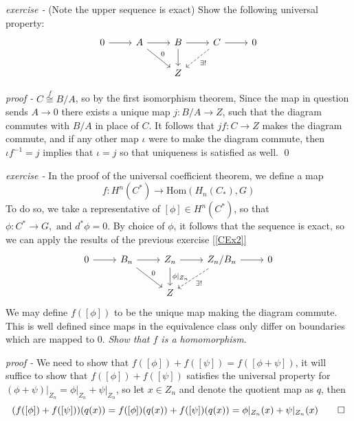 \documentclass[11pt]{article}
\theoremstyle{definition}
\newcommand{\tand}{\text{ and }}
\newcommand{\homo}{\text{Hom}}
\begin{document}

    \emph{exercise - }\label{CEx2} (Note the upper sequence is exact) Show the following universal property:
    \begin{equation*}
    \begin{tikzcd}
        0 \arrow[r] & A \arrow[r] \arrow[rd,"{0}"] & B \arrow[r] \arrow[d] & C \arrow[r] \arrow[ld,dashed,"{\exists !}"] & 0 \\
        & & Z
    \end{tikzcd}
    \end{equation*}

    \emph{proof - } \(C \overset{f}{\cong} B/A\), so by the first isomorphism theorem, Since the map in question sends \(A \to 0\) there exists a unique map \(j : B/A \to Z\), such that the diagram commutes with \(B/A\) in place of \(C\). It follows that \(jf: C \to Z\) makes the diagram commute, and if any other map \(\iota\) were to make the diagram commute, then \(\iota f^{-1} = j\) implies that \(\iota = j\) so that uniqueness is satisfied as well.  \qed


    \emph{exercise - }\label{CEx3} In the proof of the universal coefficient theorem, we define a map \[f: H^n(C^*) \to \homo(H_n(C_*),G)\]
    To do so, we take a representative of \([\phi] \in H^n(C^*)\), so that \(\phi: C^* \to G, \tand d^* \phi = 0\). By choice of \(\phi\), it follows that the sequence is exact, so we can apply the results of the previous exercise [\ref{CEx2}]
    \begin{equation*}
        \begin{tikzcd}
            0 \arrow[r] & B_n \arrow[r] \arrow[rd,"{0}"] & Z_n \arrow[r] \arrow[d,"{\phi\vert_{Z_n}}"] & Z_n/B_n \arrow[r] \arrow[ld,dashed,"{\exists !}"] & 0 \\
            & & Z
        \end{tikzcd}
    \end{equation*}
    We may define \(f([\phi])\) to be the unique map making the diagram commute. This is well defined since maps in the equivalence class only differ on boundaries which are mapped to \(0\). \emph{Show that \(f\) is a homomorphism}.

    \emph{proof - } We need to show that \(f([\phi]) + f([\psi]) = f([\phi + \psi])\), it will suffice to show that \(f([\phi]) + f([\psi])\) satisfies the universal property for \((\phi + \psi)\vert_{Z_n} = \phi \vert_{Z_n} + \psi \vert_{Z_n}\), so let \(x \in Z_n\) and denote the quotient map as \(q\), then \[(f([\phi]) + f([\psi]))(q(x)) = f([\phi])(q(x)) + f([\psi])(q(x)) = \phi\vert_{Z_n}(x) + \psi\vert_{Z_n}(x) \qed\]
\end{document}
